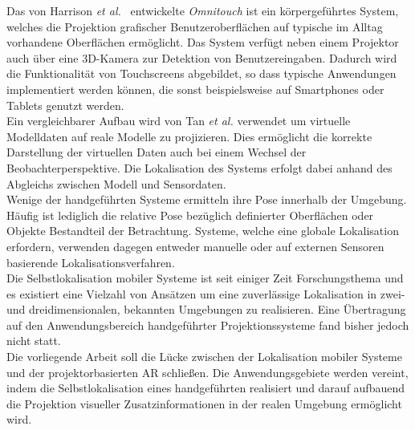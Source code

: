 Das von Harrison \textit{et al.\ }\cite{Harrison2011} entwickelte \textit{Omnitouch} ist ein körpergeführtes System, welches die Projektion grafischer Benutzeroberflächen auf typische im Alltag vorhandene Oberflächen ermöglicht. Das System verfügt neben einem Projektor auch über eine 3D-Kamera zur Detektion von Benutzereingaben. Dadurch wird die Funktionalität von Touchscreens abgebildet, so dass typische Anwendungen implementiert werden können, die sonst beispielsweise auf Smartphones oder Tablets genutzt werden.\\
Ein vergleichbarer Aufbau wird von Tan \textit{et al.} \cite{Tan2013} verwendet um virtuelle Modelldaten auf reale Modelle zu projizieren. Dies ermöglicht die korrekte Darstellung der virtuellen Daten auch bei einem Wechsel der Beobachterperspektive. Die Lokalisation des Systems erfolgt dabei anhand des Abgleichs zwischen Modell und Sensordaten.\\


Wenige der handgeführten Systeme ermitteln ihre Pose innerhalb der Umgebung. Häufig ist lediglich die relative Pose bezüglich definierter Oberflächen oder Objekte Bestandteil der Betrachtung. Systeme, welche eine globale Lokalisation erfordern, verwenden dagegen entweder manuelle oder auf externen Sensoren basierende Lokalisationsverfahren.\\
Die Selbstlokalisation mobiler Systeme ist seit einiger Zeit Forschungsthema und es existiert eine Vielzahl von Ansätzen um eine zuverlässige Lokalisation in zwei- und dreidimensionalen, bekannten Umgebungen zu realisieren. Eine Übertragung auf den Anwendungsbereich handgeführter Projektionssysteme fand bisher jedoch nicht statt.\\

Die vorliegende Arbeit soll die Lücke zwischen der Lokalisation mobiler Systeme und der projektorbasierten AR schließen. Die Anwendungsgebiete werden vereint, indem die Selbstlokalisation eines handgeführten  realisiert und darauf aufbauend die Projektion visueller Zusatzinformationen in der realen Umgebung ermöglicht wird.\\



